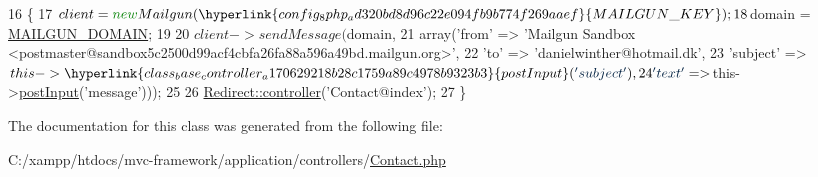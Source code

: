 \begin{DoxyCode}
16                                \{
17         $client = \textcolor{keyword}{new} Mailgun(\hyperlink{config_8php_ad320bd8d96c22e094fb9b774f269aaef}{MAILGUN\_KEY});
18         $domain = \hyperlink{config_8php_a2de069ac064bb137af53d99e3fcff3c8}{MAILGUN\_DOMAIN};
19 
20         $client->sendMessage($domain,
21             array(\textcolor{stringliteral}{'from'}    => \textcolor{stringliteral}{'Mailgun Sandbox
       <postmaster@sandbox5c2500d99acf4cbfa26fa88a596a49bd.mailgun.org>'},
22                 \textcolor{stringliteral}{'to'}      => \textcolor{stringliteral}{'danielwinther@hotmail.dk'},
23                 \textcolor{stringliteral}{'subject'} => $this->\hyperlink{class_base_controller_a170629218b28c1759a89c4978b9323b3}{postInput}(\textcolor{stringliteral}{'subject'}),
24                 \textcolor{stringliteral}{'text'}    => $this->\hyperlink{class_base_controller_a170629218b28c1759a89c4978b9323b3}{postInput}(\textcolor{stringliteral}{'message'})));
25 
26         \hyperlink{class_redirect_ab7d0d268b6aaa9a5470b7cb8c7eb1b61}{Redirect::controller}(\textcolor{stringliteral}{'Contact@index'});
27     \}
\end{DoxyCode}


The documentation for this class was generated from the following file\+:\begin{DoxyCompactItemize}
\item 
C\+:/xampp/htdocs/mvc-\/framework/application/controllers/\hyperlink{controllers_2_contact_8php}{Contact.\+php}\end{DoxyCompactItemize}

